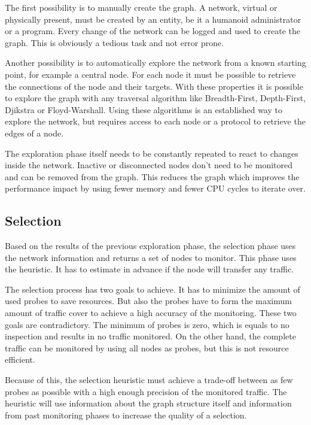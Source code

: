 \documentclass[thesis.tex]{subfiles}
\begin{document}
The first possibility is to manually create the graph. A network, virtual or physically present, must be created by an entity, be it a humanoid administrator or a program. Every change of the network can be logged and used to create the graph. This is obviously a tedious task and not error prone. 

Another possibility is to automatically explore the network from a known starting point, for example a central node. For each node it must be possible to retrieve the connections of the node and their targets. With these properties it is possible to explore the graph with any traversal algorithm like Breadth-First, Depth-First, Djikstra or Floyd-Warshall. \cite{Sedgewick.2011} Using these algorithms is an established way to explore the network, but requires access to each node or a protocol to retrieve the edges of a node.

The exploration phase itself needs to be constantly repeated to react to changes inside the network. Inactive or disconnected nodes don't need to be monitored and can be removed from the graph. This reduces the graph which improves the performance impact by using fewer memory and fewer CPU cycles to iterate over.

\subsection{Selection} \label{sec:main:selectionPhase}

Based on the results of the previous exploration phase, the selection phase uses the network information and returns a set of nodes to monitor. This phase uses the heuristic. It has to estimate in advance if the node will transfer any traffic.

The selection process has two goals to achieve. It has to minimize the amount of used probes to save resources. But also the probes have to form the maximum amount of traffic cover to achieve a high accuracy of the monitoring. These two goals are contradictory. The minimum of probes is zero, which is equals to no inspection and results in no traffic monitored. On the other hand, the complete traffic can be monitored by using all nodes as probes, but this is not resource efficient.

Because of this, the selection heuristic must achieve a trade-off between as few probes as possible with a high enough precision of the monitored traffic. The heuristic will use information about the graph structure itself and information from past monitoring phases to increase the quality of a selection.
\end{document}
